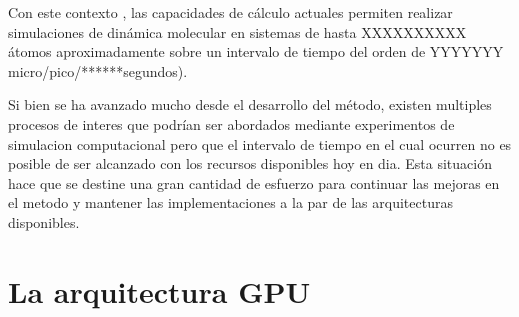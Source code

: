 \documentclass[a4paper,10pt]{report}
\begin{document}
Con este contexto , las capacidades de cálculo actuales permiten realizar simulaciones de dinámica molecular en sistemas de hasta XXXXXXXXXX átomos aproximadamente sobre un intervalo de tiempo del orden de YYYYYYY  micro/pico/******segundos).

Si bien se ha avanzado mucho desde el desarrollo del método, existen multiples procesos de interes que podrían ser abordados mediante experimentos de simulacion computacional pero que el intervalo de tiempo en el cual ocurren no es posible de ser alcanzado con los recursos disponibles hoy en dia.
Esta situación hace que se destine una gran cantidad de esfuerzo para continuar las mejoras en el metodo y mantener las implementaciones a la par de las arquitecturas disponibles.





\chapter{La arquitectura GPU}
\end{document}
